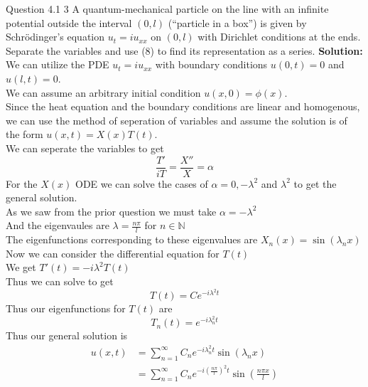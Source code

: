 \documentclass[answers,12pt,addpoints]{exam}
\begin{document}
\begin{questions}
    \question Question 4.1 3
    A quantum-mechanical particle on the line with an infinite potential outside the interval $(0,l)$ (“particle in a box”) is given by Schrödinger's equation $u_t = i u_{xx}$ on $(0,l)$ with Dirichlet conditions at the ends. Separate the variables and use (8) to find its representation as a series.
    \textbf{Solution:}\\
    We can utilize the PDE $u_t = iu_{xx}$ with boundary conditions $u(0,t) = 0$ and $u(l,t) = 0$.\\
    We can assume an arbitrary initial condition $u(x,0) = \phi(x)$.\\
    Since the heat equation and the boundary conditions are linear and homogenous, we can use the method of seperation of variables and assume the solution is of the form $u(x,t) = X(x)T(t)$.\\
    We can seperate the variables to get
    $$ \frac{T'}{iT} = \frac{X''}{X} = \alpha$$
    For the $X(x)$ ODE we can solve the cases of $\alpha = 0, -\lambda^2$ and $\lambda^2$ to get the general solution.\\
    As we saw from the prior question we must take $\alpha = -\lambda^2$\\
    And the eigenvaules are $\lambda = \frac{n\pi}{l}$ for $n \in \mathbb{N}$\\
    The eigenfunctions corresponding to these eigenvalues are $X_n(x) = \sin(\lambda_n x)$\\
    Now we can consider the differential equation for $T(t)$\\
    We get $T'(t) = -i\lambda^2 T(t)$\\
    Thus we can solve to get
    $$T(t) = C e^{-i\lambda^2 t} $$
    Thus our eigenfunctions for $T(t)$ are
    $$ T_n(t) = e^{-i\lambda_n^2 t}$$
    Thus our general solution is
    \begin{align*}
        u(x,t) &= \sum_{n=1}^{\infty} C_n e^{-i \lambda_n^2 t} \sin(\lambda_n x)\\
        &= \sum_{n=1}^{\infty} C_n e^{-i \left(\frac{n\pi}{l}\right)^2 t} \sin\left(\frac{n\pi x}{l}\right)
    \end{align*}

\end{questions}
\end{document}
